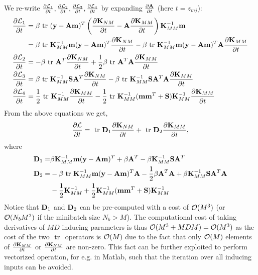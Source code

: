 \documentclass{article} %
\begin{document}
\noindent We re-write $\deriv{\calL_1}{t}, \deriv{\calL_2}{t}, \deriv{ \calL_3}{t}, \deriv{\calL_4}{t}$ by expanding $\deriv{\A}{t}$ (here $t = z_{mj}$):
\begin{align}
\nonumber
\deriv{\calL_1}{t}
 &= \beta \trace (\y - \A\m)^T \left(\deriv{\K_{NM}}{t} -  \A \deriv{ \K_{MM}}{t}\right)\K_{MM}^{-1} \m \\
&= \beta \trace \K_{MM}^{-1} \m (\y - \A\m)^T \deriv{\K_{NM}}{t} 
-\beta \trace \K_{MM}^{-1} \m (\y - \A\m)^T \A \deriv{\K_{MM}}{t} \\
\deriv{\calL_2}{t}
&= - \beta \trace \A^T \deriv{\K_{NM}}{t}
 + \frac{1}{2} \beta \trace \A^T \A \deriv{\K_{MM}}{t}  \\
\deriv{\calL_3}{t}
&= \beta \trace \K_{MM}^{-1} \S \A^T \deriv{\K_{NM}}{t}
 - \beta \trace \K_{MM}^{-1} \S \A^T \A \deriv{\K_{MM}}{t}\\
\deriv{\calL_4}{t}
 &= \frac{1}{2}  \trace \K_{MM}^{-1} \deriv{\K_{MM}}{t}
  - \frac{1}{2} \trace \K_{MM}^{-1} (\m \m^T + \S) \K_{MM}^{-1} \deriv{\K_{MM}}{t} 
\end{align}
From the above equations we get,
\begin{align}
\deriv{\calL}{t} = \trace \D_1 \deriv{\K_{NM}}{t} + \trace \D_2 \deriv{ \K_{MM}}{t},
\end{align}
where 
\begin{align}
\D_1 =& \beta \K_{MM}^{-1} \m (\y - \A\m)^T
 + \beta \A^T
 - \beta \K_{MM}^{-1} \S \A^T \\ \nonumber
\D_2 =& -\beta \trace \K_{MM}^{-1} \m (\y - \A\m)^T \A
 - \frac{1}{2} \beta \A^T \A
  + \beta \K_{MM}^{-1} \S \A^T \A	 \\ 
  &-\frac{1}{2} \K_{MM}^{-1} + \frac{1}{2} \K_{MM}^{-1} (\m \m^T + \S) \K_{MM}^{-1}
\end{align}
Notice that $\D_1$ and $\D_2$ can be pre-computed with a cost of $\calO(M^3)$ (or $\calO(N_bM^2)$ if the minibatch size $N_b > M$).
The computational cost of taking derivatives of $MD$ inducing parameters is thus $\calO(M^3 + MDM) = \calO(M^3)$ as the cost of the two $\trace$ operators is $\calO(M)$ due to the fact that only $\calO(M)$ elements of $\deriv{\K_{MM}}{t}$ or $\deriv{\K_{NM}}{t}$ are non-zero.
This fact can be further exploited to perform vectorized operation, for e.g. in Matlab, such that the iteration over all inducing inputs can be avoided.
\end{document}
